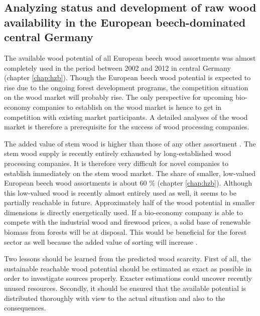\subsection{Analyzing status and development of raw wood availability in the European beech-dominated central Germany}
\label{subsec:discussion:struct:hzb}
The available wood potential of all European beech wood assortments was almost completely used in the period between 2002 and 2012 in central Germany (chapter \ref{chap:hzb}). Though the European beech wood potential is expected to rise due to the ongoing forest development programs, the competition situation on the wood market will probably rise. The only perspective for upcoming bio-economy companies to establish on the wood market is hence to get in competition with existing market participants. A detailed analyses of the wood market is therefore a prerequisite for the success of wood processing companies. 

The added value of stem wood is higher than those of any other assortment \citep{nagel_2008}. The stem wood supply is recently entirely exhausted by long-established wood processing companies. It is therefore very difficult for novel companies to establish immediately on the stem wood market. The share of smaller, low-valued European beech wood assortments is about 60 \% (chapter \ref{chap:hzb}). Although this low-valued wood is recently almost entirely used as well, it seems to be partially reachable in future. Approximately half of the wood potential in smaller dimensions is directly energetically used. If a bio-economy company is able to compete with the industrial wood and firewood prices, a solid base of renewable biomass from forests will be at disposal. This would be beneficial for the forest sector as well because the added value of sorting will increase \cite[p. 67]{mohring_1997}.

Two lessons should be learned from the predicted wood scarcity. First of all, the sustainable reachable wood potential should be estimated as exact as possible in order to investigate sources properly. Exacter estimations could uncover recently unused resources. Secondly, it should be ensured that the available potential is distributed thoroughly with view to the actual situation and also to the consequences.

